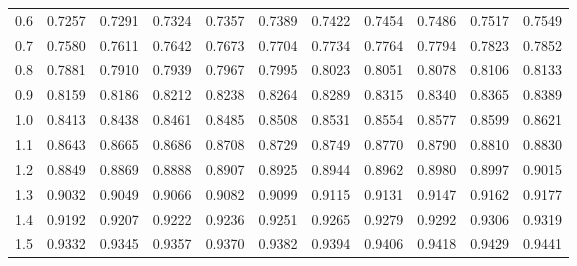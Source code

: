 \begin{table}[p]
\begin{center}
{\begin{tabular}{c | rrrrr | rrrrr |}
  0.6 & \scriptsize{0.7257} & \scriptsize{0.7291} & \scriptsize{0.7324} & \scriptsize{0.7357} & \scriptsize{0.7389} & \scriptsize{0.7422} & \scriptsize{0.7454} & \scriptsize{0.7486} & \scriptsize{0.7517} & \scriptsize{0.7549} \\
  0.7 & \scriptsize{0.7580} & \scriptsize{0.7611} & \scriptsize{0.7642} & \scriptsize{0.7673} & \scriptsize{0.7704} & \scriptsize{0.7734} & \scriptsize{0.7764} & \scriptsize{0.7794} & \scriptsize{0.7823} & \scriptsize{0.7852} \\
  0.8 & \scriptsize{0.7881} & \scriptsize{0.7910} & \scriptsize{0.7939} & \scriptsize{0.7967} & \scriptsize{0.7995} & \scriptsize{0.8023} & \scriptsize{0.8051} & \scriptsize{0.8078} & \scriptsize{0.8106} & \scriptsize{0.8133} \\
  0.9 & \scriptsize{0.8159} & \scriptsize{0.8186} & \scriptsize{0.8212} & \scriptsize{0.8238} & \scriptsize{0.8264} & \scriptsize{0.8289} & \scriptsize{0.8315} & \scriptsize{0.8340} & \scriptsize{0.8365} & \scriptsize{0.8389} \\
  \hline
  \hline
  1.0 & \scriptsize{0.8413} & \scriptsize{0.8438} & \scriptsize{0.8461} & \scriptsize{0.8485} & \scriptsize{0.8508} & \scriptsize{0.8531} & \scriptsize{0.8554} & \scriptsize{0.8577} & \scriptsize{0.8599} & \scriptsize{0.8621} \\
  1.1 & \scriptsize{0.8643} & \scriptsize{0.8665} & \scriptsize{0.8686} & \scriptsize{0.8708} & \scriptsize{0.8729} & \scriptsize{0.8749} & \scriptsize{0.8770} & \scriptsize{0.8790} & \scriptsize{0.8810} & \scriptsize{0.8830} \\
  1.2 & \scriptsize{0.8849} & \scriptsize{0.8869} & \scriptsize{0.8888} & \scriptsize{0.8907} & \scriptsize{0.8925} & \scriptsize{0.8944} & \scriptsize{0.8962} & \scriptsize{0.8980} & \scriptsize{0.8997} & \scriptsize{0.9015} \\
  1.3 & \scriptsize{0.9032} & \scriptsize{0.9049} & \scriptsize{0.9066} & \scriptsize{0.9082} & \scriptsize{0.9099} & \scriptsize{0.9115} & \scriptsize{0.9131} & \scriptsize{0.9147} & \scriptsize{0.9162} & \scriptsize{0.9177} \\
  1.4 & \scriptsize{0.9192} & \scriptsize{0.9207} & \scriptsize{0.9222} & \scriptsize{0.9236} & \scriptsize{0.9251} & \scriptsize{0.9265} & \scriptsize{0.9279} & \scriptsize{0.9292} & \scriptsize{0.9306} & \scriptsize{0.9319} \\
  \hline
  1.5 & \scriptsize{0.9332} & \scriptsize{0.9345} & \scriptsize{0.9357} & \scriptsize{0.9370} & \scriptsize{0.9382} & \scriptsize{0.9394} & \scriptsize{0.9406} & \scriptsize{0.9418} & \scriptsize{0.9429} & \scriptsize{0.9441} \\

\end{tabular}}
\end{center}
\end{table}
